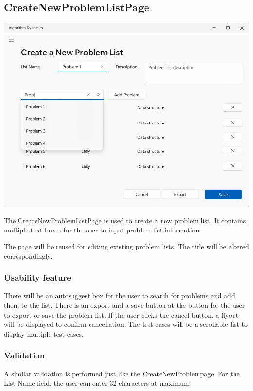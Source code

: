 \documentclass[a4paper]{report}
\begin{document}
\subsection{CreateNewProblemListPage}

\includegraphics[width=\textwidth, height=\textheight, keepaspectratio]{CreateNewProblemListPage-design}

The CreateNewProblemListPage is used to create a new problem list. It contains multiple text boxes for the user to input problem list information.

The page will be reused for editing existing problem lists. The title will be altered correspondingly.

\subsubsection{Usability feature}

There will be an autosuggest box for the user to search for problems and add them to the list. There is an export and a save button at the button for the user to export or save the problem list. If the user clicks the cancel button, a flyout will be displayed to confirm cancellation. The test cases will be a scrollable list to display multiple test cases.

\subsubsection{Validation}

A similar validation is performed just like the CreateNewProblempage. For the List Name field, the user can enter 32 characters at maximum.
\end{document}
